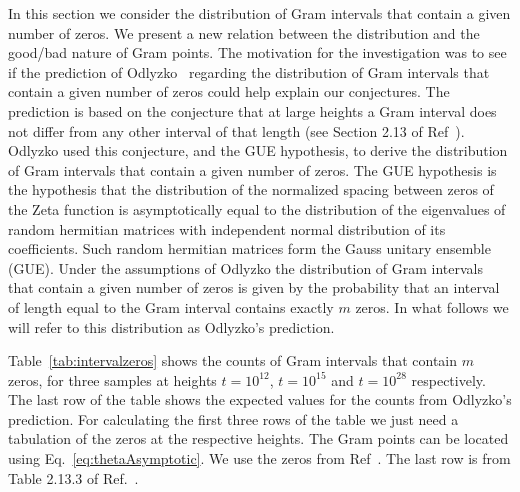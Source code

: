 \documentclass[twoside]{article}
\theoremstyle{definition}
\begin{document}
In this section we consider the distribution of Gram intervals that contain a given number of zeros. We present a new relation between the distribution and the good/bad nature of Gram points. 
The motivation for the investigation was to see if 
 the prediction of Odlyzko~\cite{Odlyzko 1992} regarding the distribution of Gram intervals that contain a given number of zeros could help explain our conjectures. The prediction is based on the conjecture that at large heights a Gram interval does not differ from any other interval of that length (see Section 2.13 of Ref~\cite{Odlyzko 1992}). Odlyzko used this conjecture, and the GUE hypothesis, to derive the distribution of Gram intervals that contain a given number of zeros.  
The GUE hypothesis  is the hypothesis that the distribution of the normalized spacing between zeros of the Zeta function is asymptotically equal to the distribution of the eigenvalues of random hermitian matrices with independent normal distribution of its coefficients. Such random hermitian matrices form the Gauss unitary ensemble (GUE). Under the assumptions of Odlyzko the distribution of Gram intervals that contain a given number of zeros is given by the probability that an interval of length equal to the Gram interval contains exactly $m$ zeros. In what follows we will refer to this distribution as Odlyzko's prediction.

Table~\ref{tab:intervalzeros} shows the counts of Gram intervals that contain $m$ zeros, for three samples at heights $t=10^{12}$, $t=10^{15}$  and $t=10^{28}$ respectively. The last row of the table shows the  expected values for the counts from Odlyzko's prediction. For calculating the first three rows of the table we just need a tabulation of the zeros at the respective heights. The Gram points can be located using Eq.~\ref{eq:thetaAsymptotic}. We use the zeros from Ref~\cite{hiary 2010}. The last row is from Table 2.13.3 of Ref.~\cite{Odlyzko 1992}.
\end{document}
